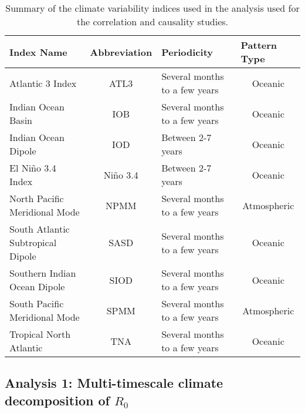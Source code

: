 \documentclass[article,10pt,twocolumn]{wlscirep}
\begin{document}
  \begin{table*}[t]
    \centering
    \begin{tabular}{l|c|l|c}
    \textbf{Index Name}                 & \multicolumn{1}{l|}{\textbf{Abbreviation}} & \textbf{Periodicity}          & \multicolumn{1}{l|}{\textbf{Pattern Type}} \\ \hline
    Atlantic 3 Index                    & ATL3                                       & Several months to a few years & Oceanic                                    \\
    Indian Ocean Basin                  & IOB                                        & Several months to a few years & Oceanic                                    \\
    Indian Ocean Dipole                 & IOD                                        & Between 2-7 years             & Oceanic                                    \\
    El Niño 3.4 Index                   & Niño 3.4                                   & Between 2-7 years             & Oceanic                                    \\
    North Pacific Meridional Mode       & NPMM                                       & Several months to a few years & Atmospheric                                \\
    South Atlantic Subtropical Dipole & SASD                                      & Several months to a few years & Oceanic                                    \\
    Southern Indian Ocean Dipole        & SIOD                                       & Several months to a few years & Oceanic                                    \\
    South Pacific Meridional Mode       & SPMM                                       & Several months to a few years & Atmospheric                                \\
    Tropical North Atlantic             & TNA                                        & Several months to a few years & Oceanic                                    
    \end{tabular}%
    \caption{Summary of the climate variability indices used in the analysis used for the correlation and causality studies.}
    \label{tab:climate-variability-indices}
  \end{table*}
  
  \subsection{Analysis 1: Multi-timescale climate decomposition of $R_0$} \label{sec-methods-1-analysis}
  
\end{document}
